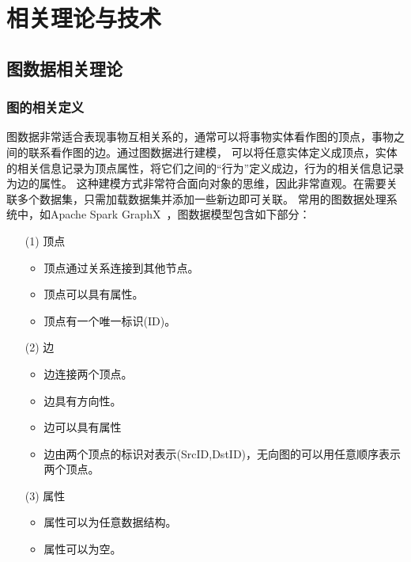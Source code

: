 \documentclass[master]{thesis-uestc}
\begin{document}



\chapter{相关理论与技术}
\label{chapter:theory}
\section{图数据相关理论}
\label{sec:graph-theory}

\subsection{图的相关定义}
\label{subsec:graph-define}
    
    图数据非常适合表现事物互相关系的，通常可以将事物实体看作图的顶点，事物之间的联系看作图的边。通过图数据进行建模，
可以将任意实体定义成顶点，实体的相关信息记录为顶点属性，将它们之间的“行为”定义成边，行为的相关信息记录为边的属性。
这种建模方式非常符合面向对象的思维，因此非常直观。在需要关联多个数据集，只需加载数据集并添加一些新边即可关联。
常用的图数据处理系统中，如Apache Spark GraphX~\cite{GraphX}，图数据模型包含如下部分：
\begin{enumerate}
    \item[(1)] 顶点
    \begin{itemize}
        \item 顶点通过关系连接到其他节点。
        \item 顶点可以具有属性。
        \item 顶点有一个唯一标识(ID)。
    \end{itemize}
    \item[(2)] 边
    \begin{itemize}
        \item 边连接两个顶点。
        \item 边具有方向性。
        \item 边可以具有属性
        \item 边由两个顶点的标识对表示(SrcID,DstID)，无向图的可以用任意顺序表示两个顶点。
    \end{itemize}
    \item[(3)] 属性
    \begin{itemize}
        \item 属性可以为任意数据结构。
        \item 属性可以为空。
    \end{itemize}
\end{enumerate}
\end{document}
